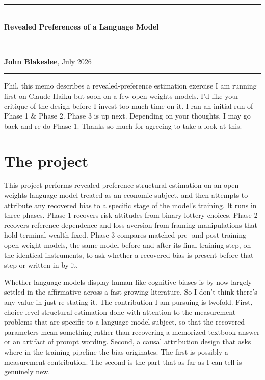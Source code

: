 \documentclass[11pt]{article}
\begin{document}
\begin{flushleft}
{\color{rulegray}\rule{\linewidth}{1.2pt}}\\[9pt]
{\LARGE\bfseries\color{ink} Revealed Preferences of a Language Model}\\[10pt]
{\color{rulegray}\rule{\linewidth}{0.8pt}}\\[6pt]
{\small\color{ink}\textbf{John Blakeslee}, July 2026}\\[3pt]
{\color{rulegray}\rule{\linewidth}{1.2pt}}
\end{flushleft}

\vspace{4pt}

Phil, this memo describes a revealed-preference estimation exercise I am running first on Claude Haiku
but soon on a few open weights models. I'd like your critique of the design before I invest too much
time on it. I ran an initial run of Phase 1 \& Phase 2. Phase 3 is up next. Depending on your thoughts,
I may go back and re-do Phase 1. Thanks so much for agreeing to take a look at this.

\section{The project}

This project performs revealed-preference structural estimation on an open weights language model
treated as an economic subject, and then attempts to attribute any recovered bias to a specific stage
of the model's training. It runs in three phases. Phase 1 recovers risk attitudes from binary lottery
choices. Phase 2 recovers reference dependence and loss aversion from framing manipulations that hold
terminal wealth fixed. Phase 3 compares matched pre- and post-training open-weight models, the same
model before and after its final training step, on the identical instruments, to ask whether a recovered
bias is present before that step or written in by it.

Whether language models display human-like cognitive biases is by now largely settled in the affirmative
across a fast-growing literature. So I don't think there's any value in just re-stating it. The
contribution I am pursuing is twofold. First, choice-level structural estimation done with attention to
the measurement problems that are specific to a language-model subject, so that the recovered parameters
mean something rather than recovering a memorized textbook answer or an artifact of prompt wording.
Second, a causal attribution design that asks where in the training pipeline the bias originates. The
first is possibly a measurement contribution. The second is the part that as far as I can tell is
genuinely new.
\end{document}
